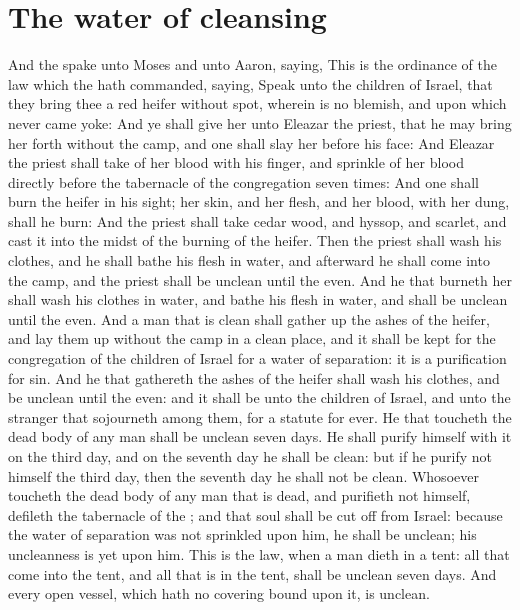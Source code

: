 \section*{The water of cleansing}
\begin{biblechapter} %
\verse And the \LORD spake unto Moses and unto Aaron, saying,
\verse This is the ordinance of the law which the \LORD hath commanded, saying, Speak unto the children of Israel, that they bring thee a red heifer without spot, wherein is no blemish, and upon which never came yoke:
\verse And ye shall give her unto Eleazar the priest, that he may bring her forth without the camp, and one shall slay her before his face:
\verse And Eleazar the priest shall take of her blood with his finger, and sprinkle of her blood directly before the tabernacle of the congregation seven times:
\verse And one shall burn the heifer in his sight; her skin, and her flesh, and her blood, with her dung, shall he burn:
\verse And the priest shall take cedar wood, and hyssop, and scarlet, and cast it into the midst of the burning of the heifer.
\verse Then the priest shall wash his clothes, and he shall bathe his flesh in water, and afterward he shall come into the camp, and the priest shall be unclean until the even.
\verse And he that burneth her shall wash his clothes in water, and bathe his flesh in water, and shall be unclean until the even.
\verse And a man that is clean shall gather up the ashes of the heifer, and lay them up without the camp in a clean place, and it shall be kept for the congregation of the children of Israel for a water of separation: it is a purification for sin.
\verse And he that gathereth the ashes of the heifer shall wash his clothes, and be unclean until the even: and it shall be unto the children of Israel, and unto the stranger that sojourneth among them, for a statute for ever.
\verse He that toucheth the dead body of any man shall be unclean seven days.
\verse He shall purify himself with it on the third day, and on the seventh day he shall be clean: but if he purify not himself the third day, then the seventh day he shall not be clean.
\verse Whosoever toucheth the dead body of any man that is dead, and purifieth not himself, defileth the tabernacle of the \LORD; and that soul shall be cut off from Israel: because the water of separation was not sprinkled upon him, he shall be unclean; his uncleanness is yet upon him.
\verse This is the law, when a man dieth in a tent: all that come into the tent, and all that is in the tent, shall be unclean seven days.
\verse And every open vessel, which hath no covering bound upon it, is unclean.

\end{biblechapter}
